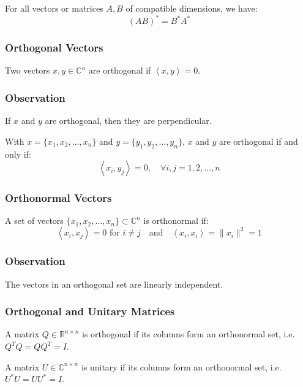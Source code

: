\documentclass[11pt]{article}
\newcommand{\inner}[2]{\left\langle #1, #2 \right\rangle}
\begin{document}
For all vectors or matrices $A, B$ of compatible dimensions, we have:
\[(A B)^* = B^* A^*\]

\subsubsection{Orthogonal Vectors}
Two vectors $x, y \in \mathbb{C}^n$ are orthogonal if $\inner{x}{y} = 0$.

\subsubsection*{Observation}
If $x$ and $y$ are orthogonal, then they are perpendicular.

With $x = \{x_1, x_2, \ldots, x_n\}$ and $y = \{y_1, y_2, \ldots, y_n\}$, $x$ and $y$ are orthogonal if and only if:
\[\inner{x_i}{y_j} = 0, \quad \forall i, j = 1, 2, \ldots, n\]

\subsubsection{Orthonormal Vectors}
A set of vectors $\{x_1, x_2, \ldots, x_n\} \subset \mathbb{C}^n$ is orthonormal if:
\[\inner{x_i}{x_j} = 0 \text{ for } i \neq j \quad \text{and} \quad \inner{x_i}{x_i} = \|x_i\|^2 = 1\]

\subsubsection*{Observation}
The vectors in an orthogonal set are linearly independent.

\subsubsection{Orthogonal and Unitary Matrices}
A matrix $Q \in \mathbb{R}^{n \times n}$ is orthogonal if its columns form an orthonormal set, i.e. $Q^T Q = QQ^T = I$.

A matrix $U \in \mathbb{C}^{n \times n}$ is unitary if its columns form an orthonormal set, i.e. $U^* U = UU^* = I$.
\end{document}
